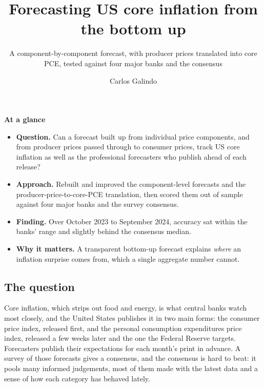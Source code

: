 \documentclass[
  british,
  a4paper,
]{article}
\title{Forecasting US core inflation from the bottom up}
\subtitle{A component-by-component forecast, with producer prices
translated into core PCE, tested against four major banks and the
consensus}
\author{Carlos Galindo}
\date{}
\providecommand{\tightlist}{%
  \setlength{\itemsep}{0pt}\setlength{\parskip}{0pt}}
\begin{document}
\maketitle


\begin{tcolorbox}[enhanced jigsaw, arc=.35mm, bottomrule=.15mm, breakable, colback=white, colframe=quarto-callout-note-color-frame, left=2mm, leftrule=.75mm, opacityback=0, rightrule=.15mm, toprule=.15mm]

\vspace{-3mm}\textbf{At a glance}\vspace{3mm}

\begin{itemize}
\tightlist
\item
  \textbf{Question.} Can a forecast built up from individual price
  components, and from producer prices passed through to consumer
  prices, track US core inflation as well as the professional
  forecasters who publish ahead of each release?
\item
  \textbf{Approach.} Rebuilt and improved the component-level forecasts
  and the producer-price-to-core-PCE translation, then scored them out
  of sample against four major banks and the survey consensus.
\item
  \textbf{Finding.} Over October 2023 to September 2024, accuracy sat
  within the banks' range and slightly behind the consensus median.
\item
  \textbf{Why it matters.} A transparent bottom-up forecast explains
  \emph{where} an inflation surprise comes from, which a single
  aggregate number cannot.
\end{itemize}

\end{tcolorbox}

\subsection{The question}\label{the-question}

Core inflation, which strips out food and energy, is what central banks
watch most closely, and the United States publishes it in two main
forms: the consumer price index, released first, and the personal
consumption expenditures price index, released a few weeks later and the
one the Federal Reserve targets. Forecasters publish their expectations
for each month's print in advance. A survey of those forecasts gives a
consensus, and the consensus is hard to beat: it pools many informed
judgements, most of them made with the latest data and a sense of how
each category has behaved lately.
\end{document}
